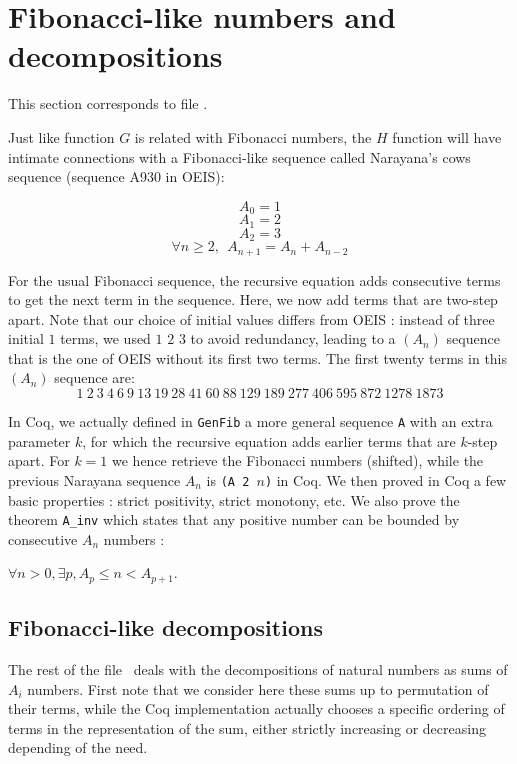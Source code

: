 \documentclass[a4paper,11pt]{article}
\begin{document}
\section{Fibonacci-like numbers and decompositions}

This section corresponds to file .

Just like function $G$ is related with Fibonacci numbers,
the $H$ function will have intimate connections with a Fibonacci-like sequence
called Narayana's cows sequence (sequence A930 in OEIS\cite{OEIS-Cow}):

$$A_0 = 1 $$
$$A_1 = 2 $$
$$A_2 = 3 $$
$$\forall n\ge 2,~~ A_{n+1} = A_{n}+A_{n-2}$$

For the usual Fibonacci sequence, the recursive equation adds
consecutive terms to get the next term in the sequence. Here, we now add
terms that are two-step apart. Note that our choice of initial values
differs from OEIS : instead of three initial $1$ terms, we used
$1$ $2$ $3$ to avoid redundancy,
leading to a $(A_n)$ sequence that is the one of OEIS without its
first two terms. The first twenty terms in this $(A_n)$ sequence are:
%
$$ 1 ~ 2 ~ 3 ~ 4 ~ 6 ~ 9 ~ 13 ~ 19 ~ 28 ~ 41 ~ 60 ~ 88 ~ 129 ~ 189 ~
277 ~ 406 ~ 595 ~ 872 ~ 1278 ~ 1873 $$

In Coq, we actually defined in {\tt GenFib} a more general sequence
{\tt A} with an extra parameter $k$, for which the recursive equation
adds earlier terms that are $k$-step apart.
For $k=1$ we hence retrieve the Fibonacci numbers (shifted), while the previous
Narayana sequence $A_n$ is {\tt (A 2 $n$)} in Coq.
We then proved in Coq a few basic properties :
strict positivity, strict monotony, etc.
We also prove the theorem {\tt A\_inv} which states
that any positive number can be bounded by
consecutive $A_n$ numbers :

\begin{theorem}\label{fibinv}
$\forall n>0, \exists p, A_p \le n < A_{p+1}$.
\end{theorem}

\subsection{Fibonacci-like decompositions} The rest of the file \
deals with the decompositions of natural numbers as sums of $A_i$
numbers. First note that we consider here these sums up to permutation of
their terms, while the Coq implementation actually chooses a specific
ordering of terms in the representation of the sum, either strictly
increasing or decreasing depending of the need.
\end{document}
